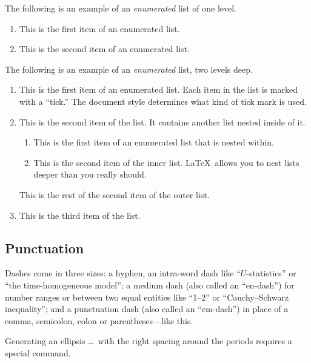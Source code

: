 \documentclass[ejsv2]{imsart}
\theoremstyle{plain}
\theoremstyle{definition}
\theoremstyle{remark}
\begin{document}
The following is an example of an \emph{enumerated} list of one level.

\begin{enumerate}
\item This is the first item of an enumerated list.
\item This is the second item of an enumerated list.
\end{enumerate}

The following is an example of an \emph{enumerated} list, two levels deep.
\begin{enumerate}
\item
This is the first item of an enumerated list.  Each item
in the list is marked with a ``tick.''  The document
style determines what kind of tick mark is used.
\item
This is the second item of the list.  It contains another
list nested inside of it.
\begin{enumerate}
\item
This is the first item of an enumerated list that
is nested within.
\item
This is the second item of the inner list.  \LaTeX\
allows you to nest lists deeper than you really should.
\end{enumerate}
This is the rest of the second item of the outer list.
\item
This is the third item of the list.
\end{enumerate}

\subsection{Punctuation}
Dashes come in three sizes: a hyphen, an intra-word dash like ``$U$-statistics'' or ``the time-homogeneous model'';
a medium dash (also called an ``en-dash'') for number ranges or between two equal entities like ``1--2'' or ``Cauchy--Schwarz inequality'';
and a punctuation dash (also called an ``em-dash'') in place of a comma, semicolon,
colon or parentheses---like this.

Generating an ellipsis \ldots\ with the right spacing
around the periods requires a special command.
\end{document}
